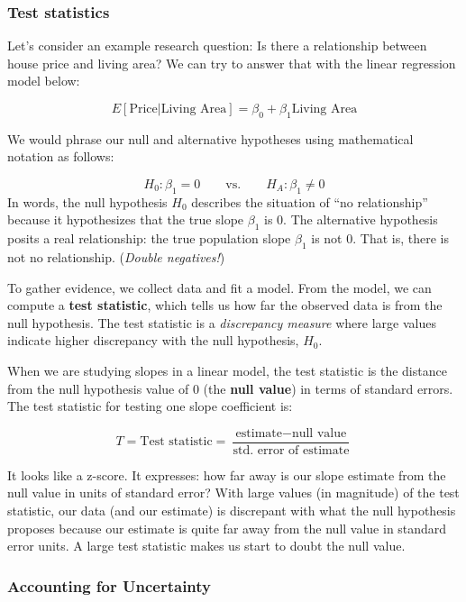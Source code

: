 \documentclass[
]{book}
\begin{document}
\hypertarget{test-statistics}{%
\subsubsection{Test statistics}\label{test-statistics}}

Let's consider an example research question: Is there a relationship between house price and living area? We can try to answer that with the linear regression model below:

\[E[\text{Price} | \text{Living Area}] = \beta_0 + \beta_1\text{Living Area}\]

We would phrase our null and alternative hypotheses using mathematical notation as follows:

\[H_0: \beta_1 = 0 \qquad \text{vs.} \qquad H_A: \beta_1 \neq 0\]
In words, the null hypothesis \(H_0\) describes the situation of ``no relationship'' because it hypothesizes that the true slope \(\beta_1\) is 0. The alternative hypothesis posits a real relationship: the true population slope \(\beta_1\) is not 0. That is, there is not no relationship. (\emph{Double negatives!})

To gather evidence, we collect data and fit a model. From the model, we can compute a \textbf{test statistic}, which tells us how far the observed data is from the null hypothesis. The test statistic is a \emph{discrepancy measure} where large values indicate higher discrepancy with the null hypothesis, \(H_0\).

When we are studying slopes in a linear model, the test statistic is the distance from the null hypothesis value of 0 (the \textbf{null value}) in terms of standard errors. The test statistic for testing one slope coefficient is:

\[T= \text{Test statistic} = \frac{\text{estimate} - \text{null value}}{\text{std. error of estimate}}\]

It looks like a z-score. It expresses: how far away is our slope estimate from the null value in units of standard error? With large values (in magnitude) of the test statistic, our data (and our estimate) is discrepant with what the null hypothesis proposes because our estimate is quite far away from the null value in standard error units. A large test statistic makes us start to doubt the null value.

\hypertarget{accounting-for-uncertainty}{%
\subsubsection{Accounting for Uncertainty}\label{accounting-for-uncertainty}}
\end{document}
